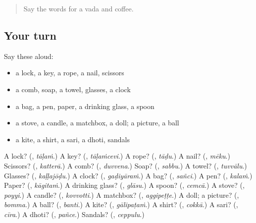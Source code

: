 \label{lesson:TE-R119-first-pass-the-house-and-things-you-carry}



\begin{quote}
Say the words for a vada and coffee.
\end{quote}

\subsection*{Your turn}
Say these aloud:

\begin{itemize}
\raggedright
  \item a lock, a key, a rope, a nail, scissors
  \item a comb, soap, a towel, glasses, a clock
  \item a bag, a pen, paper, a drinking glass, a spoon
  \item a stove, a candle, a matchbox, a doll; a picture, a ball
  \item a kite, a shirt, a sari, a dhoti, sandals
\end{itemize}

\begin{tcolorbox}[breakable,colback=teal!4,colframe=teal!35!black,title={Before you move on}]
A lock? (\textbf{}, \emph{tāḷaṁ}.) A key? (\textbf{}, \emph{tāḷaṁcevi}.) A rope? (\textbf{}, \emph{tāḍu}.) A nail? (\textbf{}, \emph{mēku}.) Scissors? (\textbf{}, \emph{katterā}.) A comb? (\textbf{}, \emph{duvvena}.) Soap? (\textbf{}, \emph{sabbu}.) A towel? (\textbf{}, \emph{tuvvālu}.) Glasses? (\textbf{}, \emph{kaḷḷajōḍu}.) A clock? (\textbf{}, \emph{gaḍiyāraṁ}.) A bag? (\textbf{}, \emph{sañci}.) A pen? (\textbf{}, \emph{kalaṁ}.) Paper? (\textbf{}, \emph{kāgitaṁ}.) A drinking glass? (\textbf{}, \emph{glāsu}.) A spoon? (\textbf{}, \emph{cemcā}.) A stove? (\textbf{}, \emph{poyyi}.) A candle? (\textbf{}, \emph{kovvotti}.) A matchbox? (\textbf{}, \emph{aggipeṭṭe}.) A doll; a picture? (\textbf{}, \emph{bomma}.) A ball? (\textbf{}, \emph{banti}.) A kite? (\textbf{}, \emph{gālipaṭaṁ}.) A shirt? (\textbf{}, \emph{cokkā}.) A sari? (\textbf{}, \emph{cīra}.) A dhoti? (\textbf{}, \emph{pañce}.) Sandals? (\textbf{}, \emph{ceppulu}.)
\end{tcolorbox}
